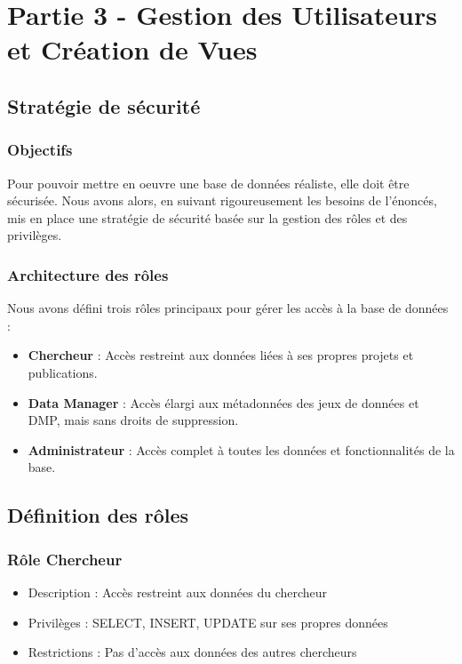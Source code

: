 \documentclass[12pt,a4paper]{article}
\begin{document}
\section{Partie 3 - Gestion des Utilisateurs et Création de Vues}

\subsection{Stratégie de sécurité}

\subsubsection{Objectifs}
Pour pouvoir mettre en oeuvre une base de données réaliste, elle doit être sécurisée. Nous avons alors, en suivant rigoureusement les besoins de l'énoncés, mis en place une stratégie de sécurité basée sur la gestion des rôles et des privilèges.

\subsubsection{Architecture des rôles}
Nous avons défini trois rôles principaux pour gérer les accès à la base de données :
\begin{itemize}
    \item \textbf{Chercheur} : Accès restreint aux données liées à ses propres projets et publications.
    \item \textbf{Data Manager} : Accès élargi aux métadonnées des jeux de données et DMP, mais sans droits de suppression.
    \item \textbf{Administrateur} : Accès complet à toutes les données et fonctionnalités de la base.
\end{itemize}

\subsection{Définition des rôles}

\subsubsection{Rôle Chercheur}
\begin{itemize}
    \item Description : Accès restreint aux données du chercheur
    \item Privilèges : SELECT, INSERT, UPDATE sur ses propres données
    \item Restrictions : Pas d'accès aux données des autres chercheurs
\end{itemize}
\end{document}
